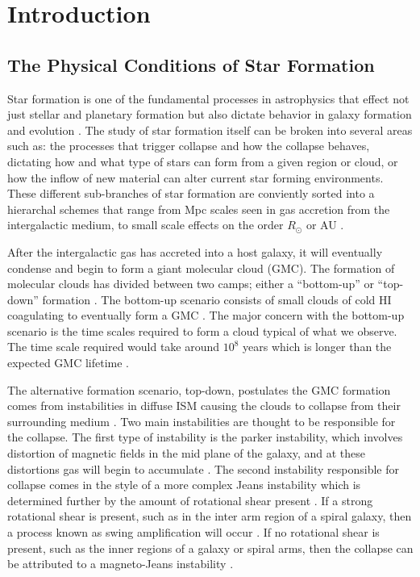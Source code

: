 \chapter{Introduction}\label{intro}

\section{The Physical Conditions of Star Formation} %

Star formation is one of the fundamental processes in astrophysics that effect not just stellar and planetary formation but also dictate behavior in galaxy formation and evolution \citep{kennicutt2012}.  The study of star formation itself can be broken into several areas such as: the processes that trigger collapse and how the collapse behaves, dictating how and what type of stars can form from a given region or cloud, or how the inflow of new material can alter current star forming environments.  These different sub-branches of star formation are conviently sorted into a hierarchal schemes that range from Mpc scales seen in gas accretion from the intergalactic medium, to small scale effects on the order $R_\odot$ or AU \citep{kennicutt2012}.

After the intergalactic gas has accreted into a host galaxy, it will eventually condense and begin to form a giant molecular cloud (GMC).  The formation of molecular clouds has divided between two camps; either a ``bottom-up'' or ``top-down'' formation \citep{mckee2007}.  The bottom-up scenario consists of small clouds of cold HI coagulating to eventually form a GMC \citep{field1965, kwan1979}.  The major concern with the bottom-up scenario is the time scales required to form a cloud typical of what we observe.  The time scale required would take around $10^8$ years which is longer than the expected GMC lifetime \citep{mckee2007}.  

The alternative formation scenario, top-down, postulates the GMC formation comes from instabilities in diffuse ISM causing the clouds to collapse from their surrounding medium \citep{mckee2007}.  Two main instabilities are thought to be responsible for the collapse.  The first type of instability is the parker instability, which involves distortion of magnetic fields in the mid plane of the galaxy, and at these distortions gas will begin to accumulate \citep{parker1966, dobbs2013}.  The second instability responsible for collapse comes in the style of a more complex Jeans instability which is determined further by the amount of rotational shear present \citep{mckee2007}.  If a strong rotational shear is present, such as in the inter arm region of a spiral galaxy, then a process known as swing amplification will occur \citep{mckee2007}.  If no rotational shear is present, such as the inner regions of a galaxy or spiral arms, then the collapse can be attributed to a magneto-Jeans instability \citep{elmegreen1987,kim2001}.

